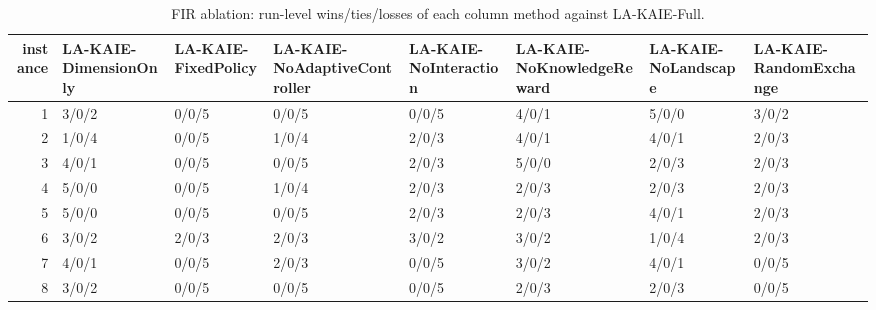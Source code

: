 \begin{table}[t]
\centering
\scriptsize
\caption{FIR ablation: run-level wins/ties/losses of each column method against LA-KAIE-Full.}
\label{tab:fir_ablation_wtl}
\begin{tabular}{rlllllll}
\toprule
instance & LA-KAIE-DimensionOnly & LA-KAIE-FixedPolicy & LA-KAIE-NoAdaptiveController & LA-KAIE-NoInteraction & LA-KAIE-NoKnowledgeReward & LA-KAIE-NoLandscape & LA-KAIE-RandomExchange \\
\midrule
1 & 3/0/2 & 0/0/5 & 0/0/5 & 0/0/5 & 4/0/1 & 5/0/0 & 3/0/2 \\
2 & 1/0/4 & 0/0/5 & 1/0/4 & 2/0/3 & 4/0/1 & 4/0/1 & 2/0/3 \\
3 & 4/0/1 & 0/0/5 & 0/0/5 & 2/0/3 & 5/0/0 & 2/0/3 & 2/0/3 \\
4 & 5/0/0 & 0/0/5 & 1/0/4 & 2/0/3 & 2/0/3 & 2/0/3 & 2/0/3 \\
5 & 5/0/0 & 0/0/5 & 0/0/5 & 2/0/3 & 2/0/3 & 4/0/1 & 2/0/3 \\
6 & 3/0/2 & 2/0/3 & 2/0/3 & 3/0/2 & 3/0/2 & 1/0/4 & 2/0/3 \\
7 & 4/0/1 & 0/0/5 & 2/0/3 & 0/0/5 & 3/0/2 & 4/0/1 & 0/0/5 \\
8 & 3/0/2 & 0/0/5 & 0/0/5 & 0/0/5 & 2/0/3 & 2/0/3 & 0/0/5 \\
\bottomrule
\end{tabular}
\end{table}
